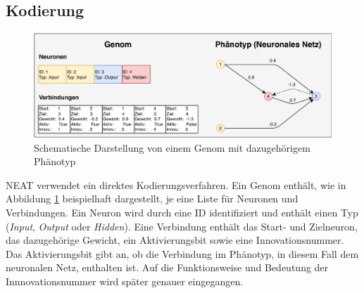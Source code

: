 \subsection{Kodierung}
\label{subsec:neat_encoding}
\begin{figure}[!h]
	\centering
	\includegraphics[width=1\textwidth]{./img/neat_genome_encoding.pdf} 
	\caption{Schematische Darstellung von einem Genom mit dazugehörigem Phänotyp}
	\label{fig:neat_encoding}
\end{figure}
\noindent
\ac{NEAT} verwendet ein direktes Kodierungsverfahren. Ein Genom enthält, wie in Abbildung \ref{fig:neat_encoding} beispielhaft dargestellt, je eine Liste für Neuronen und Verbindungen. Ein Neuron wird durch eine ID identifiziert und enthält einen Typ (\emph{Input}, \emph{Output} oder \emph{Hidden}). Eine Verbindung enthält das Start- und Zielneuron, das dazugehörige Gewicht, ein Aktivierungsbit sowie eine Innovationsnummer. Das Aktivierungsbit gibt an, ob die Verbindung im Phänotyp, in diesem Fall dem neuronalen Netz, enthalten ist. Auf die Funktionsweise und Bedeutung der Innnovationsnummer wird später genauer eingegangen.
